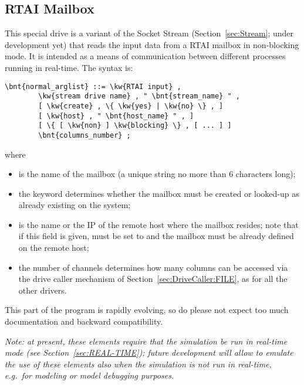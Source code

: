 \subsection{RTAI Mailbox}\label{sec:RTAI_in}
This special drive is a variant of the Socket Stream
(Section~\ref{sec:Stream}; under development yet)
that reads the input data from a RTAI mailbox in non-blocking mode.
It is intended as a means of communication between different processes
running in real-time.
The syntax is:
\begin{Verbatim}[commandchars=\\\{\}]
    \bnt{normal_arglist} ::= \kw{RTAI input} ,
        \kw{stream drive name} , " \bnt{stream_name} " ,
        [ \kw{create} , \{ \kw{yes} | \kw{no} \} , ]
        [ \kw{host} , " \bnt{host_name} " , ]
        [ \{ [ \kw{non} ] \kw{blocking} \} , [ ... ] ]
        \bnt{columns_number} ;
\end{Verbatim}
where
\begin{itemize}
\item {} is the name of the mailbox (a unique string 
no more than 6 characters long);
\item the  keyword determines whether the mailbox 
must be created or looked-up as already existing on the system;
\item {} is the name or the IP of the remote host where 
the mailbox resides; note that if this field is given,  must
be set to  and the mailbox must be already defined
on the remote host;
\item the number of channels  determines how many
columns can be accessed via the  drive caller mechanism 
of Section~\ref{sec:DriveCaller:FILE}, as for all the other  drivers.
\end{itemize}
This part of the program is rapidly evolving, so do please not expect
too much documentation and backward compatibility.

\emph{Note: at present, these elements require that the simulation
be run in real-time mode (see Section~\ref{sec:REAL-TIME});
future development will allow to emulate the use of these elements
also when the simulation is not run in real-time, e.g.\ for modeling
or model debugging purposes.}



